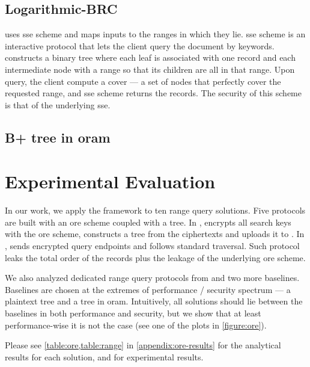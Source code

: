 			\subsection{Logarithmic-BRC}

				\cite{practical-range-search} uses \gls{sse} scheme and maps inputs to the ranges in which they lie.
				\gls{sse} scheme is an interactive protocol that lets the client query the document by keywords.
				\cite{practical-range-search} constructs a binary tree where each leaf is associated with one record and each intermediate node with a range so that its children are all in that range.
				Upon query, the client compute a cover --- a set of nodes that perfectly cover the requested range, and \gls{sse} scheme returns the records.
				The security of this scheme is that of the underlying \gls{sse}.

			\subsection{B+ tree in \acrshort{oram}}

	\section{Experimental Evaluation}

		In our work, we apply the framework to ten range query solutions.
		Five protocols are built with an \acrfull{ore} scheme coupled with a \BPlus{} tree.
		In \protocolSetup{}, \client{} encrypts all search keys with the \acrshort{ore} scheme, constructs a \BPlus{} tree from the ciphertexts and uploads it to \server{}.
		In \protocolQuery{}, \client{} sends encrypted query endpoints and \server{} follows standard \BPlus{} traversal.
		Such protocol leaks the total order of the records plus the leakage of the underlying \acrshort{ore} scheme.

		We also analyzed dedicated range query protocols from \cite{florian-protocol,pope,practical-range-search} and two more baselines.
		Baselines are chosen at the extremes of performance / security spectrum --- a plaintext \BPlus{} tree and a \BPlus{} tree in \acrshort{oram}.
		Intuitively, all solutions should lie between the baselines in both performance and security, but we show that at least performance-wise it is not the case (see one of the plots in \cref{figure:ore}).

		Please see \cref{table:ore,table:range} in \cref{appendix:ore-results} for the analytical results for each solution, and \cite{ore-benchmark-17} for experimental results.

		
